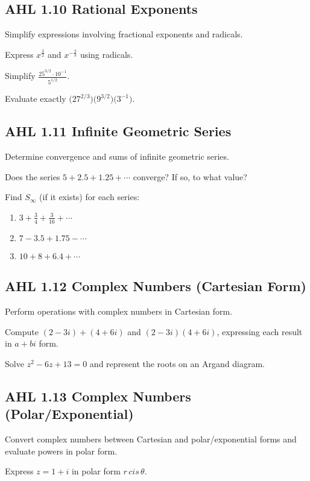 \documentclass[11pt]{article}
\def\mathrm#1{#1}%
\newcommand{\tocsubsection}[1]{\subsection{#1}}
\newcounter{question}
\begin{document}
\tocsubsection{AHL  1.10  \; Rational  Exponents}
Simplify expressions involving fractional exponents and radicals.

\begin{question}
Express $x^{\frac{3}{2}}$ and $x^{-\frac{2}{3}}$ using radicals.
\end{question}

\begin{question}
Simplify $\displaystyle\frac{25^{3/2}\cdot 10^{-1}}{5^{1/2}}$.
\end{question}

\begin{question}
Evaluate exactly $\bigl(27^{2/3}\bigr)\bigl(9^{3/2}\bigr)\bigl(3^{-1}\bigr)$.
\end{question}

\tocsubsection{AHL  1.11  \; Infinite  Geometric  Series}
Determine convergence and sums of infinite geometric series.

\begin{question}
Does the series $5+2.5+1.25+\cdots$ converge?  If so, to what value?
\end{question}

\begin{question}
Find $S_\infty$ (if it exists) for each series:
\begin{enumerate}[label=\alph*)]
\item $3+\tfrac{3}{4}+\tfrac{3}{16}+\cdots$
\item $7-3.5+1.75-\cdots$
\item $10+8+6.4+\cdots$
\end{enumerate}
\end{question}

\tocsubsection{AHL  1.12  \; Complex  Numbers  (Cartesian  Form)}
Perform operations with complex numbers in Cartesian form.

\begin{question}
Compute $(2-3i)+(4+6i)$ and $(2-3i)(4+6i)$, expressing each result in $a+bi$ form.
\end{question}

\begin{question}
Solve $z^2-6z+13=0$ and represent the roots on an Argand diagram.
\end{question}

\tocsubsection{AHL  1.13  \; Complex  Numbers  (Polar/Exponential)}
Convert complex numbers between Cartesian and polar/exponential forms and
evaluate powers in polar form.

\begin{question}
Express $z=1+i$ in polar form $r\,\mathrm{cis}\,\theta$.
\end{question}
\end{document}

